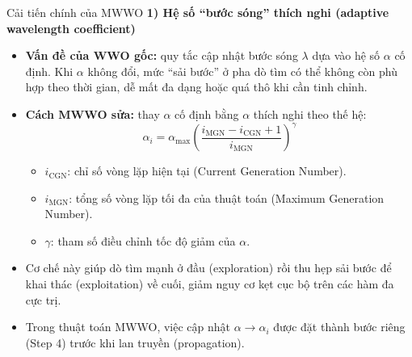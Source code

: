 \begin{frame}{Cải tiến chính của MWWO}
    \textbf{1) Hệ số ``bước sóng'' thích nghi (adaptive wavelength coefficient)}
    \begin{itemize}
        \item \textbf{Vấn đề của WWO gốc:} quy tắc cập nhật bước sóng $\lambda$ dựa vào hệ số $\alpha$ cố định. Khi $\alpha$ không đổi, mức ``sải bước'' ở pha dò tìm có thể không còn phù hợp theo thời gian, dễ mất đa dạng hoặc quá thô khi cần tinh chỉnh.
        \item \textbf{Cách MWWO sửa:} thay $\alpha$ cố định bằng $\alpha$ thích nghi theo thế hệ:
        \begin{equation}
            \alpha_i = \alpha_{\max} \left( \frac{i_{\text{MGN}} - i_{\text{CGN}} + 1}{i_{\text{MGN}}} \right)^{\gamma}
        \end{equation}

        
        \begin{itemize}
            \item $i_{\text{CGN}}$: chỉ số vòng lặp hiện tại (Current Generation Number).
            \item $i_{\text{MGN}}$: tổng số vòng lặp tối đa của thuật toán (Maximum Generation Number).
            \item $\gamma$: tham số điều chỉnh tốc độ giảm của $\alpha$.
        \end{itemize}
        \item Cơ chế này giúp dò tìm mạnh ở đầu (exploration) rồi thu hẹp sải bước để khai thác (exploitation) về cuối, giảm nguy cơ kẹt cục bộ trên các hàm đa cực trị.
        \item Trong thuật toán MWWO, việc cập nhật $\alpha \rightarrow \alpha_i$ được đặt thành bước riêng (Step 4) trước khi lan truyền (propagation).
    \end{itemize}
    
\end{frame}

